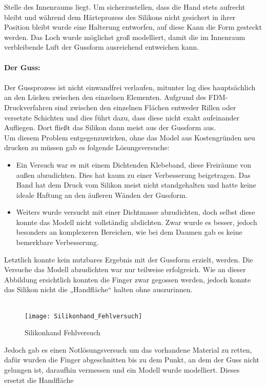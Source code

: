 \documentclass[titlepage,12pt,twoside]{article}
\begin{document}
Stelle des Innenraums liegt. Um sicherzustellen, dass die Hand stets aufrecht bleibt und während dem Härteprozess des Silikons nicht gesichert in ihrer Position bleibt wurde eine Halterung entworfen, auf diese Kann die Form gesteckt werden. Das Loch 
wurde möglichst groß modelliert, damit die im Innenraum verbleibende Luft der Gussform ausreichend entweichen kann. \\
\\
\textbf{Der Guss:} \\
\\
Der Gussprozess ist nicht einwandfrei verlaufen, mitunter lag dies hauptsächlich an den Lücken zwischen den einzelnen Elementen. Aufgrund des FDM-Druckverfahren sind zwischen den einzelnen Flächen entweder Rillen oder versetzte Schichten und dies 
führt dazu, dass diese nicht exakt aufeinander Aufliegen. Dort fließt das Silikon dann meist aus der Gussform aus. \\
Um diesem Problem entgegenzuwirken, ohne das Model aus Kostengründen neu drucken zu müssen gab es folgende Lösungsversuche:
\begin{itemize}
	\item Ein Versuch war es mit einem Dichtenden Klebeband, diese Freiräume von außen abzudichten. Dies hat kaum zu einer Verbesserung beigetragen. Das Band hat dem Druck vom Silikon meist nicht standgehalten und hatte keine ideale Haftung an 
	den äußeren Wänden der Gussform.
	\item Weiters wurde versucht mit einer Dichtmasse abzudichten, doch selbst diese konnte das Modell nicht vollständig abdichten. Zwar wurde es besser, jedoch besonders an komplexeren Bereichen, wie bei dem Daumen gab es keine bemerkbare Verbesserung.
\end{itemize}
\hfill \break
Letztlich konnte kein nutzbares Ergebnis mit der Gussform erzielt, werden. Die Versuche das Modell abzudichten war nur teilweise erfolgreich. Wie an dieser Abbildung ersichtlich konnten die Finger zwar gegossen werden, jedoch konnte das Silikon 
nicht die „Handfläche“ halten ohne auszurinnen. \\
\\
\begin{figure}[H]
	\begin{center}
		\scalebox{1.2}
		{\texttt{[image: Silikonhand\_Fehlversuch]}}
		\caption{Silikonhand Fehlversuch}
		\label{fig:Silikonhand_Fehlversuch}			
	\end{center}
\end{figure}
\hfill \break
Jedoch gab es einen Notlösungsversuch um das vorhandene Material zu retten, dafür wurden die Finger abgeschnitten bis zu dem Punkt, an dem der Guss nicht gelungen ist, daraufhin vermessen und ein Modell wurde modelliert. Dieses ersetzt die Handfläche 
\end{document}
